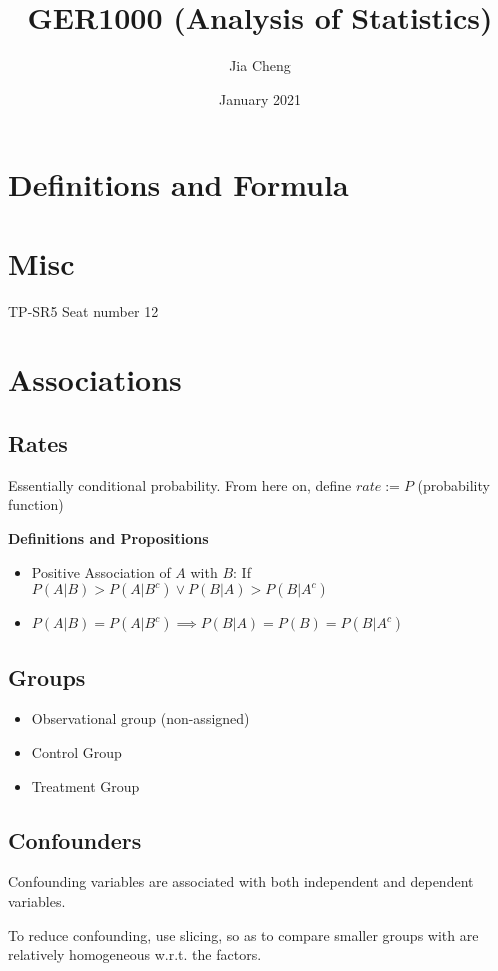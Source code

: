\documentclass{article}
\title{GER1000 (Analysis of Statistics)}
\author{Jia Cheng}
\date{January 2021}
\begin{document}
\maketitle

\section{Definitions and Formula}

\section{Misc}
TP-SR5
Seat number 12

\section{Associations}
\subsection{Rates}
Essentially conditional probability.
From here on, define $rate:=P$ (probability function)

\textbf{Definitions and Propositions
}\begin{itemize}
	\item Positive Association of $A$ with $B$: If $P(A|B) > P(A|B^c) \lor P(B|A) > P(B|A^c)$
	\item $P(A|B) = P(A|B^c) \implies P(B|A) = P(B) = P(B|A^c)$
\end{itemize}

\subsection{Groups}
\begin{itemize}
	\item Observational group (non-assigned)
	\item Control Group
	\item Treatment Group
\end{itemize}

\subsection{Confounders}
Confounding variables are associated with both independent and dependent variables.

To reduce confounding, use slicing, so as to compare smaller groups with are relatively homogeneous w.r.t. the factors.
\end{document}
